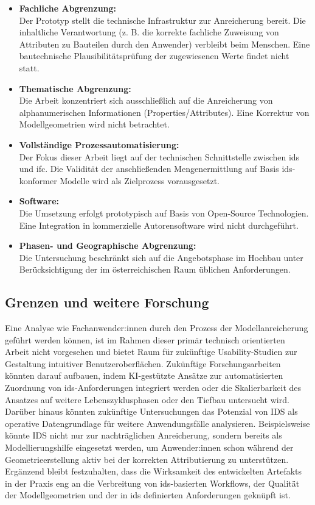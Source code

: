 \begin{itemize}
    \item \textbf{Fachliche Abgrenzung:} \\
    Der Prototyp stellt die technische Infrastruktur zur Anreicherung bereit. 
    Die inhaltliche Verantwortung (z. B. die korrekte fachliche Zuweisung von Attributen 
    zu Bauteilen durch den Anwender) verbleibt beim Menschen. Eine bautechnische 
    Plausibilitätsprüfung der zugewiesenen Werte findet nicht statt.
    \item \textbf{Thematische Abgrenzung:} \\
    Die Arbeit konzentriert sich ausschließlich auf die Anreicherung von alphanumerischen 
    Informationen (Properties/Attributes). Eine Korrektur von Modellgeometrien wird nicht 
    betrachtet.
    \item \textbf{Vollständige Prozessautomatisierung:} \\
    Der Fokus dieser Arbeit liegt auf der technischen Schnittstelle zwischen 
    \gls{ids} und \gls{ifc}. Die Validität der anschließenden Mengenermittlung auf 
    Basis \gls{ids}-konformer Modelle wird als Zielprozess vorausgesetzt. 
    \item \textbf{Software:} \\
    Die Umsetzung erfolgt prototypisch auf Basis von Open-Source Technologien. 
    Eine Integration in kommerzielle Autorensoftware wird nicht durchgeführt.
    \item \textbf{Phasen- und Geographische Abgrenzung:} \\
    Die Untersuchung beschränkt sich auf die Angebotsphase im Hochbau unter Berücksichtigung 
    der im österreichischen Raum üblichen Anforderungen.
\end{itemize}

\subsection{Grenzen und weitere Forschung}
Eine Analyse wie Fachanwender:innen durch den Prozess der Modellanreicherung geführt werden können, 
ist im Rahmen dieser primär technisch orientierten Arbeit nicht vorgesehen und bietet Raum für zukünftige 
Usability-Studien zur Gestaltung intuitiver Benutzeroberflächen. 
Zukünftige Forschungsarbeiten könnten darauf aufbauen, indem KI-gestützte Ansätze zur automatisierten 
Zuordnung von \gls{ids}-Anforderungen integriert werden oder die Skalierbarkeit des Ansatzes auf 
weitere Lebenszyklusphasen oder den Tiefbau untersucht wird. Darüber hinaus könnten zukünftige Untersuchungen 
das Potenzial von IDS als operative Datengrundlage für weitere Anwendungsfälle analysieren. Beispielsweise 
könnte IDS nicht nur zur nachträglichen Anreicherung, sondern bereits als Modellierungshilfe eingesetzt 
werden, um Anwender:innen schon während der Geometrieerstellung aktiv bei der korrekten Attributierung zu unterstützen. 
Ergänzend bleibt festzuhalten, dass die Wirksamkeit des entwickelten Artefakts in der Praxis eng an die 
Verbreitung von \gls{ids}-basierten Workflows, der Qualität der Modellgeometrien und der in \gls{ids} 
definierten Anforderungen geknüpft ist.